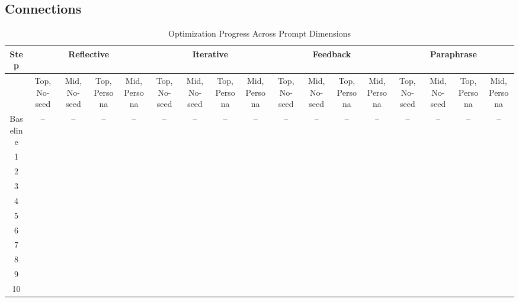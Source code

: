 \subsection{Connections}
\begin{table}[htbp]
    \centering
    \captionsetup{font=small}
    \caption{Optimization Progress Across Prompt Dimensions}
    \renewcommand{\arraystretch}{1.4} %
    
    \begin{tabular}{|c||*{16}{c|}}
    \hline
    \rowcolor{ctublue!30}
    \textbf{Step} &
    \multicolumn{4}{c|}{\cellcolor{ctublue!20}\textbf{Reflective}} &
    \multicolumn{4}{c|}{\cellcolor{ctublue!20}\textbf{Iterative}} &
    \multicolumn{4}{c|}{\cellcolor{ctublue!20}\textbf{Feedback}} &
    \multicolumn{4}{c|}{\cellcolor{ctublue!20}\textbf{Paraphrase}} \\
    \hline
    \rowcolor{ctublue!10}
    \textbf{} &
    \multicolumn{1}{c|}{\tiny Top, No-seed} & \multicolumn{1}{c|}{\tiny Mid, No-seed} & \multicolumn{1}{c|}{\tiny Top, Persona} & \multicolumn{1}{c|}{\tiny Mid, Persona} &
    \multicolumn{1}{c|}{\tiny Top, No-seed} & \multicolumn{1}{c|}{\tiny Mid, No-seed} & \multicolumn{1}{c|}{\tiny Top, Persona} & \multicolumn{1}{c|}{\tiny Mid, Persona} &
    \multicolumn{1}{c|}{\tiny Top, No-seed} & \multicolumn{1}{c|}{\tiny Mid, No-seed} & \multicolumn{1}{c|}{\tiny Top, Persona} & \multicolumn{1}{c|}{\tiny Mid, Persona} &
    \multicolumn{1}{c|}{\tiny Top, No-seed} & \multicolumn{1}{c|}{\tiny Mid, No-seed} & \multicolumn{1}{c|}{\tiny Top, Persona} & \multicolumn{1}{c|}{\tiny Mid, Persona} \\
    \hline
    
    \rowcolor{ctuorange!20}
    Baseline & -- & -- & -- & -- & -- & -- & -- & -- & -- & -- & -- & -- & -- & -- & -- & -- \\
    \hline
    
    1 &  &  &  &  &  &  &  &  &  &  &  &  &  &  &  &  \\
    \hline
    2 &  &  &  &  &  &  &  &  &  &  &  &  &  &  &  &  \\
    \hline
    3 &  &  &  &  &  &  &  &  &  &  &  &  &  &  &  &  \\
    \hline
    4 &  &  &  &  &  &  &  &  &  &  &  &  &  &  &  &  \\
    \hline
    5 &  &  &  &  &  &  &  &  &  &  &  &  &  &  &  &  \\
    \hline
    6 &  &  &  &  &  &  &  &  &  &  &  &  &  &  &  &  \\
    \hline
    7 &  &  &  &  &  &  &  &  &  &  &  &  &  &  &  &  \\
    \hline
    8 &  &  &  &  &  &  &  &  &  &  &  &  &  &  &  &  \\
    \hline
    9 &  &  &  &  &  &  &  &  &  &  &  &  &  &  &  &  \\
    \hline
    10 &  &  &  &  &  &  &  &  &  &  &  &  &  &  &  &  \\
    \hline
    
    \end{tabular}
    \end{table}
    
